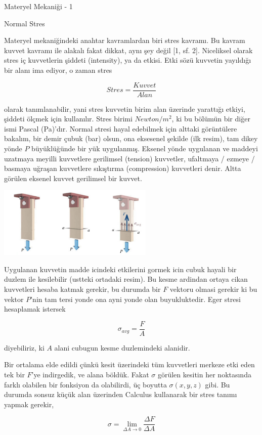 \documentclass[12pt,fleqn]{article}\usepackage{../../common}
\begin{document}
Materyel Mekaniği - 1

Normal Stres

Materyel mekaniğindeki anahtar kavramlardan biri stres kavramı. Bu kavram kuvvet
kavramı ile alakalı fakat dikkat, aynı şey değil [1, sf. 2]. Niceliksel olarak
stres iç kuvvetlerin şiddeti (intensity), ya da etkisi. Etki sözü kuvvetin
yayıldığı bir alanı ima ediyor, o zaman stres

$$
Stres = \frac{Kuvvet}{Alan}
$$

olarak tanımlanabilir, yani stres kuvvetin birim alan üzerinde yarattığı etkiyi,
şiddeti ölçmek için kullanılır. Stres birimi $Newton / m^2$, ki bu bölümün bir
diğer ismi Pascal (Pa)'dır. Normal stresi hayal edebilmek için alttaki
görüntülere bakalım, bir demir çubuk (bar) olsun, ona eksesenel şekilde (ilk
resim), tam dikey yönde $P$ büyüklüğünde bir yük uygulanmış. Eksenel yönde
uygulanan ve maddeyi uzatmaya meyilli kuvvetlere gerilimsel (tension) kuvvetler,
ufaltmaya / ezmeye / basmaya uğraşan kuvvetlere sıkıştırma (compression)
kuvvetleri denir. Altta görülen eksenel kuvvet gerilimsel bir kuvvet.

\includegraphics[width=20em]{phy_020_strs_01_01.jpg}

Uygulanan kuvvetin madde icindeki etkilerini gormek icin cubuk hayali bir duzlem
ile kesilebilir (ustteki ortadaki resim). Bu kesme ardindan ortaya cikan
kuvvetleri hesaba katmak gerekir, bu durumda bir $F$ vektoru olmasi gerekir ki
bu vektor $P$'nin tam tersi yonde ona ayni yonde olan buyukluktedir. Eger stresi
hesaplamak istersek

$$
\sigma_{avg} = \frac{F}{A}
$$

diyebiliriz, ki $A$ alani cubugun kesme duzlemindeki alanidir.

Bir ortalama elde edildi çünkü kesit üzerindeki tüm kuvvetleri merkeze etki eden
tek bir $F$'ye indirgedik, ve alana böldük. Fakat $\sigma$ görülen kesitin her
noktasında farklı olabilen bir fonksiyon da olabilirdi, üç boyutta
$\sigma(x,y,z)$ gibi. Bu durumda sonsuz küçük alan üzerinden Calculus kullanarak
bir stres tanımı yapmak gerekir,

$$
\sigma = \lim_{\Delta A \to 0} \frac{\Delta F}{\Delta A}
$$
\end{document}
